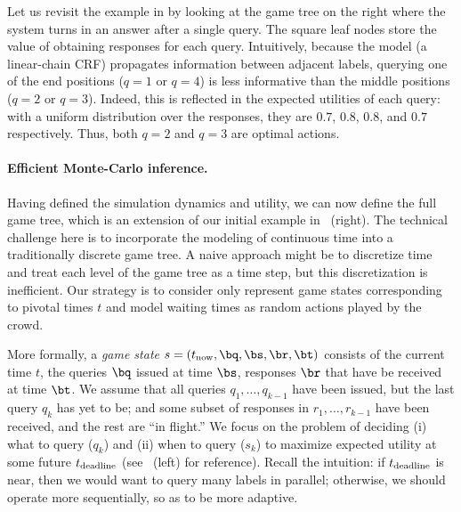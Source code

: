 Let us revisit the example in  by looking at the game tree on the right where the system turns in an answer after a single query.
The square leaf nodes store the value of obtaining responses for each query.
Intuitively, because the model (a linear-chain CRF) propagates information between adjacent labels, querying one of the end positions ($q = 1$ or $q = 4$) is less informative than the middle positions ($q = 2$ or $q = 3$).
Indeed, this is reflected in the expected utilities of each query: with a uniform distribution over the responses, they are $0.7$, $0.8$, $0.8$, and $0.7$ respectively. Thus, both $q = 2$ and $q = 3$ are optimal actions.

\paragraph{Efficient Monte-Carlo inference.}


Having defined the simulation dynamics and utility, we can now define the full game tree,
which is an extension of our initial example in ~(right).
The technical challenge here is to incorporate the modeling of continuous time
into a traditionally discrete game tree.
A naive approach might be to discretize time and treat each level of the game
tree as a time step, but this discretization is inefficient.
Our strategy is to consider only represent game states corresponding to pivotal times $t$
and model waiting times as random actions played by the crowd.

More formally, a \emph{game state} $s = (\now, \bq, \bs, \br, \bt)$
consists of the current time $t$, the queries $\bq$ issued at time $\bs$,
responses $\br$ that have be received at time $\bt$.
We assume that all queries $q_1, \dots, q_{k-1}$ have been issued,
but the last query $q_k$ has yet to be;
and some subset of responses in $r_1, \dots, r_{k-1}$ have been received,
and the rest are ``in flight.''
We focus on the problem of deciding (i) what to query ($q_k$)
and (ii) when to query ($s_k$) to maximize expected utility
at some future $t_\text{deadline}$ (see ~(left) for reference).
Recall the intuition: if $t_\text{deadline}$ is near, then we would want to query
many labels in parallel; otherwise, we should operate more sequentially,
so as to be more adaptive.


